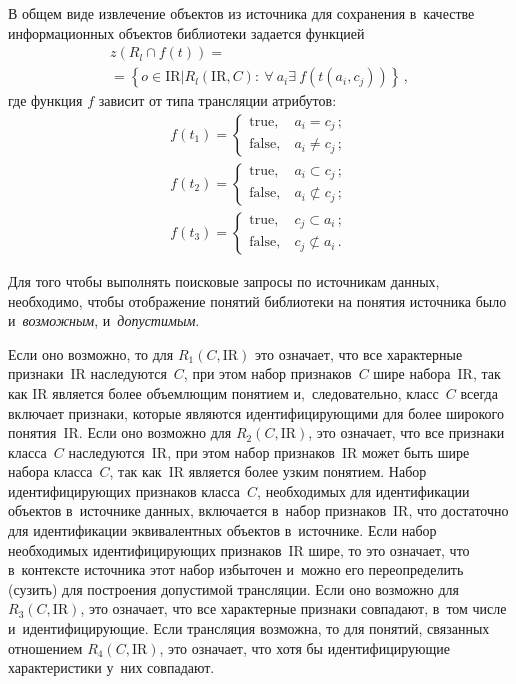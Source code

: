 \begin{multicols}{2}
    В общем виде извлечение объектов из источника для сохранения 
в~качестве информационных объектов библиотеки задается функцией
    \begin{multline*}
    z\left( R_l\cap f(t)\right) = {}\\
    {}=\left\{ o\in \mathrm{IR}\vert R_l(\mathrm{IR},C):\ \forall\ a_i\exists\ 
f(t(a_i, c_j))\right\}\,,
    \end{multline*}
где функция $f$ зависит от типа трансляции атрибутов:
\begin{gather*}
f(t_1)=\begin{cases}
\mbox{true}, &\ a_i=c_j\,;\\
\mbox{false}, &\  a_i\not=c_j\,;
\end{cases}\\
f(t_2)= \begin{cases}
\mbox{true}, &\ a_i\subset c_j\,;\\
\mbox{false}, &\ a_i \not\subset c_j\,;
\end{cases}
\\
f(t_3) = \begin{cases}
\mbox{true}, &\ c_j\subset a_i\,;\\
\mbox{false}, &\ c_j \not\subset a_i\,.
\end{cases}
\end{gather*}
    
    Для того чтобы выполнять поисковые запросы по источникам данных, 
необходимо, чтобы отображение понятий библиотеки на понятия источника 
было и~\textit{возможным}, и~\textit{допустимым}.
    
    Если оно возможно, то для $R_1(C, \mathrm{IR})$ это означает, что все 
характерные признаки~$\mathrm{IR}$ наследуются~$C$, при этом набор 
признаков~$C$ шире набора~$\mathrm{IR}$, так как $\mathrm{IR}$ является более
 объемлющим 
понятием и,~следовательно, класс~$C$ всегда включает признаки, которые 
являются идентифицирующими для более широкого понятия~$\mathrm{IR}$. Если оно 
возможно для $R_2(C, \mathrm{IR})$, это означает, что все признаки класса~$C$ 
наследуются~$\mathrm{IR}$, при этом набор признаков~$\mathrm{IR}$ может быть 
шире набора 
класса~$C$, так как~$\mathrm{IR}$ является более узким понятием. Набор 
идентифицирующих признаков класса~$C$, необходимых для 
идентификации объектов в~источнике данных, включается в~набор 
признаков~$\mathrm{IR}$, что достаточно для идентификации эквивалентных объектов 
в~источнике. Если набор необходимых идентифицирующих признаков~$\mathrm{IR}$ 
шире, то это означает, что в~контексте источника этот набор избыточен 
и~можно его переопределить (сузить) для по\-стро\-ения допустимой 
трансляции. Если оно возможно для $R_3(C, \mathrm{IR})$, это означает, что все 
характерные признаки совпадают, в~том числе и~идентифицирующие. Если 
трансляция возможна, то для понятий, связанных отношением $R_4(C, \mathrm{IR})$, 
это означает, что хотя бы идентифицирующие характеристики у~них 
совпадают.
    

\end{multicols}
